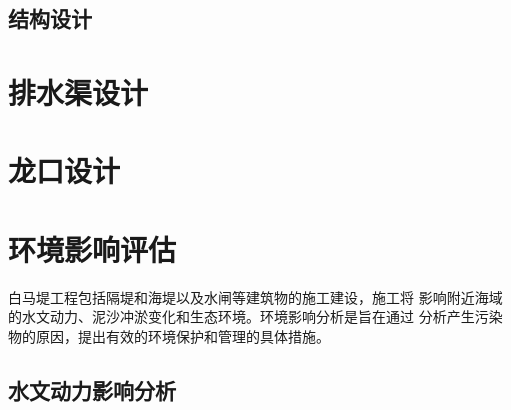 \documentclass[UTF8, a4paper, 12pt]{ctexart} %
\begin{document}
\subsection{结构设计}

\section{排水渠设计}
\section{龙口设计}


\section{环境影响评估}
白马堤工程包括隔堤和海堤以及水闸等建筑物的施工建设，施工将
影响附近海域的水文动力、泥沙冲淤变化和生态环境。环境影响分析是旨在通过
分析产生污染物的原因，提出有效的环境保护和管理的具体措施。

\subsection{水文动力影响分析}
\end{document}

